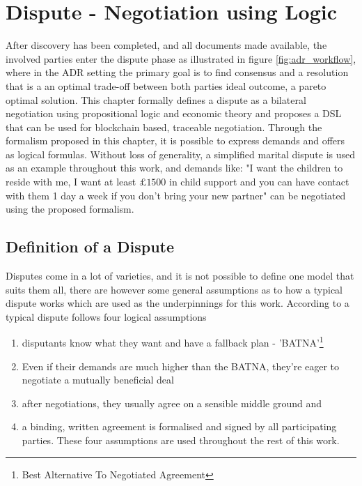 \documentclass[12pt,msc,a4paper,oneside]{ucl_thesis}
\begin{document}
\chapter{Dispute - Negotiation using Logic} \label{chapter:dispute}
After discovery has been completed, and all documents made available, the involved parties enter the dispute phase as illustrated in figure \ref{fig:adr_workflow}, where in the ADR setting the primary goal is to find consensus and a resolution that is a an optimal trade-off between both parties ideal outcome, a pareto optimal solution. This chapter formally defines a dispute as a bilateral negotiation using propositional logic and economic theory and proposes a DSL that can be used for blockchain based, traceable negotiation. Through the formalism proposed in this chapter, it is possible to express demands and offers as logical formulas. Without loss of generality, a simplified marital dispute is used as an example throughout this work, and demands like: "I want the children to reside with me, I want at least $£1500$ in child support and you can have contact with them 1 day a week if you don't bring your new partner" can be negotiated using the proposed formalism.

\section{Definition of a Dispute}
Disputes come in a lot of varieties, and it is not possible to define one model that suits them all, there are however some general assumptions as to how a typical dispute works which are used as the underpinnings for this work. According to \cite{Susskind:Logic_of_mediating_values} a typical dispute follows four logical assumptions
\begin{enumerate}
    \item{disputants know what they want and have a fallback plan - 'BATNA'\footnote{Best Alternative To Negotiated Agreement}}
    \item{Even if their demands are much higher than the BATNA, they're eager to negotiate a mutually beneficial deal}
    \item{after negotiations, they usually agree on a sensible middle ground and}
    \item{a binding, written agreement is formalised and signed by all participating parties. These four assumptions are used throughout the rest of this work.}
\end{enumerate}
\end{document}
